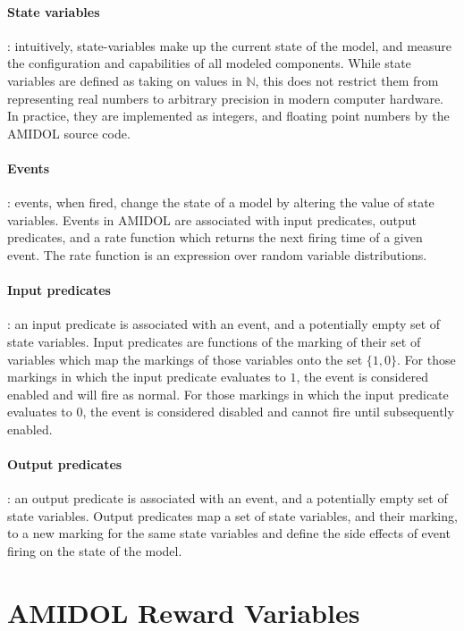 \documentclass[11pt]{article}
\newcommand{\amidol}{\textsc{AMIDOL}}
\begin{document}
\paragraph{State variables}: intuitively, state-variables make up the current state of the model, and measure the configuration and capabilities of all modeled components.  While state variables are defined as taking on values in $\mathbb{N}$, this does not restrict them from representing real numbers to arbitrary precision in modern computer hardware.  In practice, they are implemented as integers, and floating point numbers by the \amidol{} source code.

\paragraph{Events}: events, when fired, change the state of a model by altering the value of state variables.  Events in \amidol{} are associated with input predicates, output predicates, and a rate function which returns the next firing time of a given event.  The rate function is an expression over random variable distributions.

\paragraph{Input predicates}: an input predicate is associated with an event, and a potentially empty set of state variables.  Input predicates are functions of the marking of their set of variables which map the markings of those variables onto the set $\{1, 0\}$.  For those markings in which the input predicate evaluates to $1$, the event is considered enabled and will fire as normal.  For those markings in which the input predicate evaluates to $0$, the event is considered disabled and cannot fire until subsequently enabled.

\paragraph{Output predicates}: an output predicate is associated with an event, and a potentially empty set of state variables.  Output predicates map a set of state variables, and their marking, to a new marking for the same state variables and define the side effects of event firing on the state of the model.

\section{\amidol{} Reward Variables}
\end{document}
